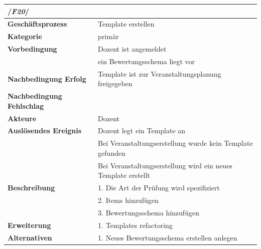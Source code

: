 		\begin{table}[H]
		\begin{tabular}{ll}
			\multicolumn{2}{l}{/\textbf{\textit{F20}}/}\\\hline
			 \textbf{Geschäftsprozess} & Template erstellen \\ 
			 \textbf{Kategorie} & primär \\ 
			 \textbf{Vorbedingung} & Dozent ist angemeldet\\
			 & ein Bewertungsschema liegt vor \\ 

			 \textbf{Nachbedingung Erfolg} & Template ist
			  zur Veranstaltungsplanung freigegeben  \\ 
			 \textbf{Nachbedingung Fehlschlag} &  \\ 
			 \textbf{Akteure} & Dozent \\ 
			 \textbf{Auslösendes Ereignis} & Dozent legt ein Template an \\
			 & Bei Veranstaltungserstellung wurde kein Template gefunden\\
			 & Bei Veranstaltungserstellung wird ein neues Template erstellt\\
			 \textbf{Beschreibung} & 1. Die Art der Prüfung wird spezifiziert \\
			 & 2. Items hinzufügen\\
			 & 3. Bewertungsschema hinzufügen\\
			  \textbf{Erweiterung} & 1. Templates refactoring \\ 
			 \textbf{Alternativen} & 1. Neues Bewertungsschema erstellen anlegen \\  			
			 \end{tabular} 
		\label{tab:F20}
		\end{table}
	
